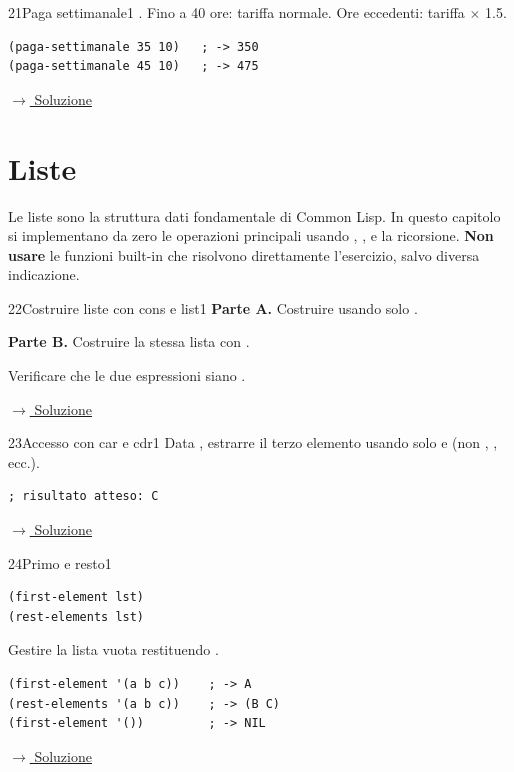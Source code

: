 \label{ex:21}
\begin{colbox}{21}{Paga settimanale}{1}
 .
Fino a 40 ore: tariffa normale.
Ore eccedenti: tariffa $\times$ 1.5.
\begin{lstlisting}
(paga-settimanale 35 10)   ; -> 350
(paga-settimanale 45 10)   ; -> 475
\end{lstlisting}


\small\color{black!55}\hyperref[sol:21]{$\rightarrow$ Soluzione}\normalsize\color{black}
\end{colbox}

\setcounter{section}{1}
\section{Liste}

\noindent
Le liste sono la struttura dati fondamentale di Common Lisp.
In questo capitolo si implementano da zero le operazioni
principali usando , ,  e la ricorsione.
\textbf{Non usare} le funzioni built-in che risolvono direttamente
l'esercizio, salvo diversa indicazione.

\bigskip

\label{ex:22}
\begin{essbox}{22}{Costruire liste con cons e list}{1}
\textbf{Parte A.} Costruire  usando solo .

\textbf{Parte B.} Costruire la stessa lista con .

Verificare che le due espressioni siano .


\small\color{black!55}\hyperref[sol:22]{$\rightarrow$ Soluzione}\normalsize\color{black}
\end{essbox}

\label{ex:23}
\begin{stdbox}{23}{Accesso con car e cdr}{1}
Data , estrarre il terzo elemento
usando solo  e  (non , , ecc.).
\begin{lstlisting}
; risultato atteso: C
\end{lstlisting}


\small\color{black!55}\hyperref[sol:23]{$\rightarrow$ Soluzione}\normalsize\color{black}
\end{stdbox}

\label{ex:24}
\begin{essbox}{24}{Primo e resto}{1}
\nopagebreak
\begin{lstlisting}
(first-element lst)
(rest-elements lst)
\end{lstlisting}
Gestire la lista vuota restituendo .
\begin{lstlisting}
(first-element '(a b c))    ; -> A
(rest-elements '(a b c))    ; -> (B C)
(first-element '())         ; -> NIL
\end{lstlisting}


\small\color{black!55}\hyperref[sol:24]{$\rightarrow$ Soluzione}\normalsize\color{black}
\end{essbox}

